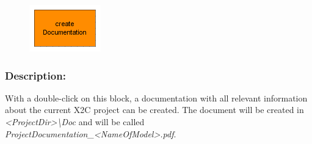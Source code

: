 %
%
%
%
%
%
%
%
\label{block:CreateDocumentation}
\begin{figure}[H]\includegraphics{Icons/ProjectDocumentation}\end{figure} 

\subsubsection*{Description:}
With a double-click on this block, a documentation with all relevant information about the current X2C project can be created. The document will be created in \textit{<ProjectDir>\textbackslash Doc} and will be called \textit{ProjectDocumentation\_<NameOfModel>.pdf}.

